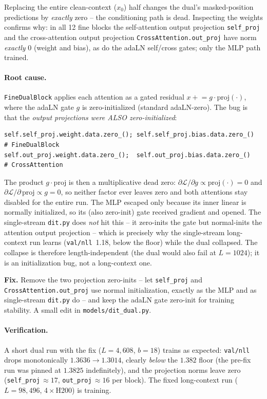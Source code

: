 \documentclass[11pt,a4paper]{article}
\begin{document}
\noindent Replacing the entire clean-context (\(x_0\)) half changes the dual's
masked-position predictions by \emph{exactly} zero -- the conditioning path is
dead. Inspecting the weights confirms why: in all 12 fine blocks the
self-attention output projection \texttt{self\_proj} and the cross-attention
output projection \texttt{CrossAttention.out\_proj} have norm \emph{exactly} 0
(weight and bias), as do the adaLN self/cross gates; only the MLP path trained.

\paragraph{Root cause.} \texttt{FineDualBlock} applies each attention as a gated
residual \(x \mathrel{+}= g \cdot \mathrm{proj}(\cdot)\), where the adaLN gate
\(g\) is zero-initialized (standard adaLN-zero). The bug is that the
\emph{output projections were ALSO zero-initialized}:
\begin{lstlisting}
self.self_proj.weight.data.zero_(); self.self_proj.bias.data.zero_()  # FineDualBlock
self.out_proj.weight.data.zero_();  self.out_proj.bias.data.zero_()   # CrossAttention
\end{lstlisting}
The product \(g\cdot\mathrm{proj}\) is then a multiplicative dead zero:
\(\partial\mathcal{L}/\partial g \propto \mathrm{proj}(\cdot)=0\) and
\(\partial\mathcal{L}/\partial\,\mathrm{proj} \propto g = 0\), so neither factor
ever leaves zero and both attentions stay disabled for the entire run. The MLP
escaped only because its inner linear is normally initialized, so its (also
zero-init) gate received gradient and opened. The single-stream \texttt{dit.py}
does \emph{not} hit this -- it zero-inits the gate but normal-inits the attention
output projection -- which is precisely why the single-stream long-context run
learns (\texttt{val/nll}~1.18, below the floor) while the dual collapsed. The
collapse is therefore length-independent (the dual would also fail at
\(L=1024\)); it is an initialization bug, not a long-context one.

\textbf{Fix.} Remove the two projection zero-inits -- let \texttt{self\_proj} and
\texttt{CrossAttention.out\_proj} use normal initialization, exactly as the MLP
and as single-stream \texttt{dit.py} do -- and keep the adaLN gate zero-init for
training stability. A small edit in \texttt{models/dit\_dual.py}.

\paragraph{Verification.} A short dual run with the fix (\(L=4{,}608\), \(b=18\))
trains as expected: \texttt{val/nll} drops monotonically \(1.3636 \to 1.3014\),
clearly \emph{below} the \(1.382\) floor (the pre-fix run was pinned at
\(1.3825\) indefinitely), and the projection norms leave zero
(\texttt{self\_proj}\(\,\approx 17\), \texttt{out\_proj}\(\,\approx 16\) per
block). The fixed long-context run (\(L=98{,}496\), 4\,\(\times\)\,H200) is
training.
\end{document}
